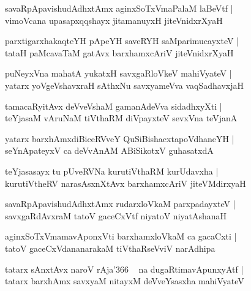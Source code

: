 \documentclass[twoside,12pt,openright]{book}
\newcounter{shloka}[chapter]
\begin{document}
\begin{shloka}
savaRpApavishudAdhxtAmx aginxSoTxVmaPalaM laBeVtf |\\
vimoVcana upasapxqqshayx jitamanuyxH jiteVnidxrXyaH 
\end{shloka}

\begin{shloka}
parxtigarxhakaqteYH pApeYH saveRYH saMparimucayxteV |\\
tataH paMcavaTaM gatAvx barxhamxcAriV jiteVnidxrXyaH 
\end{shloka}

\begin{shloka}
puNeyxVna mahatA yukatxH savxgaRloVkeV mahiVyateV |\\
yatarx yoVgeVshavxraH sAthxNu savxyameVva vaqSadhavxjaH 
\end{shloka}

\begin{shloka}
tamacaRyitAvx deVveVshaM gamanAdeVva sidadhxyXti |\\
teYjasaM vAruNaM tiVthaRM diVpayxteV sevxVna teVjanA
\end{shloka}

\begin{shloka}
yatarx barxhAmxdiBiceRVveY QuSiBishacxtapoVdhaneYH |\\
seYnApateyxV ca deVvAnAM ABiSikotxV guhasatxdA
\end{shloka}

\begin{shloka}
teYjasasayx tu pUveRVNa kurutiVthaRM  kurUdavxha |\\
kurutiVtheRV narasAsxnXtAvx barxhamxcAriV jiteVMdirxyaH 
\end{shloka}

\begin{shloka}
savaRpApavishudAdhxtAmx rudarxloVkaM parxpadayxteV |\\
savxgaRdAvxraM tatoV gaceCxVtf niyatoV niyatAshanaH 
\end{shloka}

\begin{shloka}
aginxSoTxVmamavAponxVti barxhamxloVkaM ca gacaCxti |\\
tatoV gaceCxVdananarakaM tiVthaRseVviV narAdhipa 
\end{shloka}

\begin{shloka}
tatarx sAnxtAvx naroV rAja\char'366 ~ na dugaRtimavApunxyAtf |\\
tatarx barxhAmx savxyaM nitayxM deVveYsasxha mahiVyateV 
\end{shloka}
\end{document}
